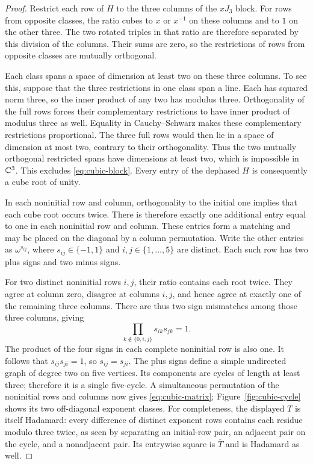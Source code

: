 \begin{proof}
Restrict each row of $H$ to the three columns of the $xJ_3$ block.
For rows from opposite classes, the ratio cubes to $x$ or $x^{-1}$ on
these columns and to $1$ on the other three. The two rotated triples
in that ratio are therefore separated by this division of the columns.
Their sums are zero, so the restrictions of rows from opposite classes
are mutually orthogonal.

Each class spans a space of dimension at least two on these three
columns. To see this, suppose that the three restrictions in one class
span a line. Each has squared norm three, so the inner product of any
two has modulus three. Orthogonality of the full rows forces their
complementary restrictions to have inner product of modulus three as
well. Equality in Cauchy--Schwarz makes these complementary restrictions
proportional. The three full rows would then lie in a space of
dimension at most two, contrary to their orthogonality. Thus the two
mutually orthogonal restricted spans have dimensions at least two,
which is impossible in $\mathbb C^3$. This excludes
\eqref{eq:cubic-block}. Every entry of the dephased $H$ is consequently
a cube root of unity.

In each noninitial row and column, orthogonality to the initial one
implies that each cube root occurs twice. There is therefore exactly
one additional entry equal to one in each noninitial row and column.
These entries form a matching and may be placed on the diagonal by a
column permutation. Write the other entries as $\omega^{s_{ij}}$, where
$s_{ij}\in\{-1,1\}$ and $i,j\in\{1,\ldots,5\}$ are distinct. Each
such row has two plus signs and two minus signs.

For two distinct noninitial rows $i,j$, their ratio contains each root
twice. They agree at column zero, disagree at columns $i,j$, and hence
agree at exactly one of the remaining three columns. There are thus
two sign mismatches among those three columns, giving
\[
 \prod_{k\notin\{0,i,j\}}s_{ik}s_{jk}=1.
\]
The product of the four signs in each complete noninitial row is also
one. It follows that $s_{ij}s_{ji}=1$, so $s_{ij}=s_{ji}$. The plus
signs define a simple undirected graph of degree two on five vertices.
Its components are cycles of length at least three; therefore it is a
single five-cycle. A simultaneous permutation of the noninitial rows
and columns now gives \eqref{eq:cubic-matrix}; Figure~\ref{fig:cubic-cycle}
shows its two off-diagonal exponent classes.
For completeness, the displayed $T$ is itself Hadamard: every
difference of distinct exponent rows contains each residue modulo
three twice, as seen by separating an initial-row pair, an adjacent
pair on the cycle, and a nonadjacent pair. Its entrywise square is
$\overline T$ and is Hadamard as well.
\end{proof}

